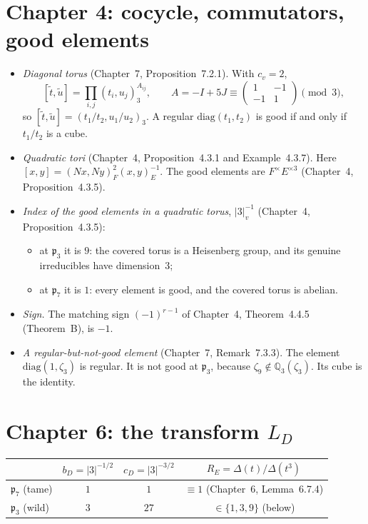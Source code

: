 \documentclass[11pt]{article}
\newcommand{\Q}{\mathbb Q}
\newcommand{\p}{\mathfrak p}
\theoremstyle{definition}
\begin{document}
\section{Chapter 4: cocycle, commutators, good elements}
\begin{itemize}
\item \emph{Diagonal torus} (Chapter~7, Proposition~7.2.1). With $c_v=2$,
\[
[\tilde t,\tilde u]=\prod_{i,j}(t_i,u_j)_3^{A_{ij}},\qquad
A=-I+5J\equiv\begin{pmatrix}1&-1\\-1&1\end{pmatrix}\pmod 3,
\]
so $[\tilde t,\tilde u]=(t_1/t_2,u_1/u_2)_3$. A regular
$\mathrm{diag}(t_1,t_2)$ is good if and only if $t_1/t_2$ is a cube.
\item \emph{Quadratic tori} (Chapter~4, Proposition~4.3.1 and Example~4.3.7).
Here $[x,y]=(Nx,Ny)_F^{2}(x,y)_E^{-1}$. The good elements are
$F^\times E^{\times3}$ (Chapter~4, Proposition~4.3.5).
\item \emph{Index of the good elements in a quadratic torus},
$|3|_v^{-1}$ (Chapter~4, Proposition~4.3.5):
\begin{itemize}
\item at $\p_3$ it is $9$: the covered torus is a Heisenberg group, and
its genuine irreducibles have dimension~$3$;
\item at $\p_7$ it is $1$: every element is good, and the covered torus
is abelian.
\end{itemize}
\item \emph{Sign.} The matching sign $(-1)^{r-1}$ of Chapter~4,
Theorem~4.4.5 (Theorem~B), is $-1$.
\item \emph{A regular-but-not-good element} (Chapter~7, Remark~7.3.3). The
element $\mathrm{diag}(1,\zeta_3)$ is regular. It is not good at
$\p_3$, because $\zeta_9\notin\Q_3(\zeta_3)$. Its cube is the identity.
\end{itemize}

\section{Chapter 6: the transform $L_D$}
\begin{center}
\begin{tabular}{@{}lccc@{}}
\toprule
& $b_D=|3|^{-1/2}$ & $c_D=|3|^{-3/2}$ & $R_E=\Delta(t)/\Delta(t^3)$\\\midrule
$\p_7$ (tame) & $1$ & $1$ & $\equiv1$ (Chapter~6, Lemma~6.7.4)\\
$\p_3$ (wild) & $3$ & $27$ & $\in\{1,3,9\}$ (below)\\
\bottomrule
\end{tabular}
\end{center}
\end{document}
